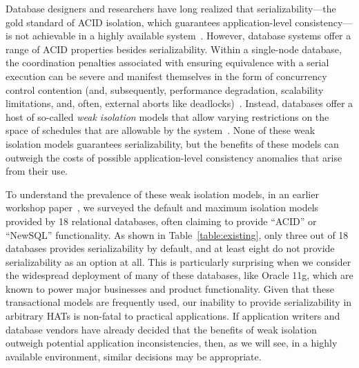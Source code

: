 Database designers and researchers have long realized that
serializability---the gold standard of ACID isolation, which
guarantees application-level consistency---is not achievable in a
highly available system~\cite{davidson-survey}.  However, database
systems offer a range of ACID properties besides
serializability. Within a single-node database, the coordination
penalties associated with ensuring equivalence with a serial execution
can be severe and manifest themselves in the form of concurrency
control contention (and, subsequently, performance degradation,
scalability limitations, and, often, external aborts like
deadlocks)~\cite{gray-isolation}. Instead, databases offer a host of
so-called \textit{weak isolation} models that allow varying
restrictions on the space of schedules that are allowable by the
system~\cite{adya}. None of these weak isolation models guarantees
serializability, but the benefits of these models can outweigh the
costs of possible application-level consistency anomalies that arise
from their use.

To understand the prevalence of these weak isolation models, in an
earlier workshop paper~\cite{hat-hotos}, we surveyed the default and
maximum isolation models provided by 18 relational databases, often
claiming to provide ``ACID'' or ``NewSQL'' functionality. As shown in
Table~\ref{table:existing}, only three out of 18 databases provides
serializability by default, and at least eight do not provide
serializability as an option at all. This is particularly surprising
when we consider the widespread deployment of many of these databases,
like Oracle 11g, which are known to power major businesses and product
functionality. Given that these transactional models are frequently
used, our inability to provide serializability in arbitrary HATs is
non-fatal to practical applications. If application writers and
database vendors have already decided that the benefits of weak
isolation outweigh potential application inconsistencies, then, as we
will see, in a highly available environment, similar decisions may be
appropriate.

